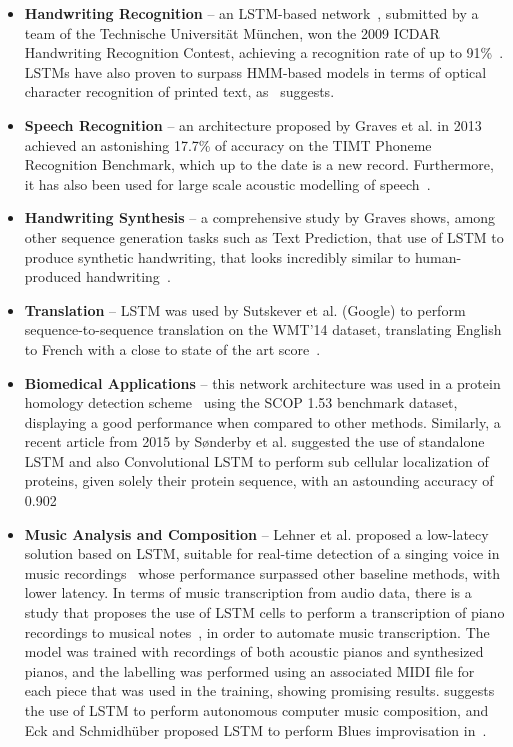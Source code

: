 \begin{itemize}
    \item \textbf{Handwriting Recognition} -- an LSTM-based network~\cite{Bertolami09}, submitted by a team of the Technische Universität München, won the 2009 ICDAR Handwriting Recognition Contest, achieving a recognition rate of up to 91\%~\cite{ICDAR09}. LSTMs have also proven to surpass HMM-based models in terms of optical character recognition of printed text, as~\cite{Breuel13} suggests.

    \item \textbf{Speech Recognition} -- an architecture\cite{Graves13} proposed by Graves et al. in 2013 achieved an astonishing 17.7\% of accuracy on the TIMT Phoneme Recognition Benchmark, which up to the date is a new record. Furthermore, it has also been used for large scale acoustic modelling of speech~\cite{Sak14}.

    \item \textbf{Handwriting Synthesis} -- a comprehensive study by Graves shows, among other sequence generation tasks such as Text Prediction, that use of LSTM to produce synthetic handwriting, that looks incredibly similar to human-produced handwriting~\cite{Graves13_2}.

    \item \textbf{Translation} -- LSTM was used by Sutskever et al. (Google) to perform sequence-to-sequence translation on the WMT'14 dataset, translating English to French with a close to state of the art score~\cite{Sustkever14}.

    \item \textbf{Biomedical Applications} -- this network architecture was used in a protein homology detection scheme~\cite{Hochreiter07} using the SCOP 1.53 benchmark dataset, displaying a good performance when compared to other methods. Similarly, a recent article from 2015 by Sønderby et al. suggested the use of standalone LSTM and also Convolutional LSTM to perform sub cellular localization of proteins, given solely their protein sequence, with an astounding accuracy of 0.902~\cite{Sonderby15}

    \item \textbf{Music Analysis and Composition} -- Lehner et al. proposed a low-latecy solution based on LSTM, suitable for real-time detection of a singing voice in music recordings~\cite{Lehner15} whose performance surpassed other baseline methods, with lower latency.
        In terms of music transcription from audio data, there is a study that proposes the use of LSTM cells to perform a transcription of piano recordings to musical notes~\cite{Bock12}, in order to automate music transcription. The model was trained with recordings of both acoustic pianos and synthesized pianos, and the labelling was performed using an associated MIDI file for each piece that was used in the training, showing promising results. \cite{Coca13} suggests the use of LSTM to perform autonomous computer music composition, and Eck and Schmidhüber proposed LSTM to perform Blues improvisation in~\cite{Eck02}.


\end{itemize}

